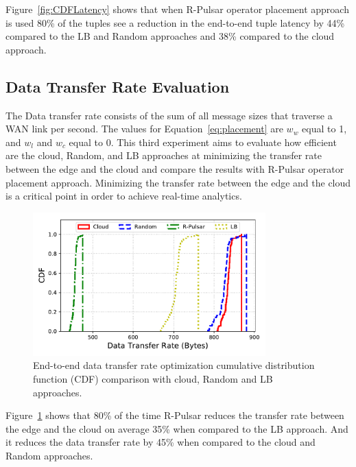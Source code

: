 Figure~\ref{fig:CDFLatency} shows that when R-Pulsar operator placement approach is used 80\% of the tuples see a reduction in the end-to-end tuple latency by 44\% compared to the LB and Random approaches and 38\% compared to the cloud approach. 

\subsection{Data Transfer Rate Evaluation}

The Data transfer rate consists of the sum of all message sizes that traverse a WAN link per second. The values for Equation~\ref{eq:placement} are $w_w$ equal to 1, and $w_l$ and $w_c$ equal to 0. This third experiment aims to evaluate how efficient are the cloud, Random, and LB approaches at minimizing the transfer rate between the edge and the cloud and compare the results with R-Pulsar operator placement approach. Minimizing the transfer rate between the edge and the cloud is a critical point in order to achieve real-time analytics. 

\begin{figure}
  \centering
  \includegraphics[width=0.8\textwidth]{Results/CDF_bandwidth.pdf}
  \caption{End-to-end data transfer rate optimization cumulative distribution function (CDF) comparison with cloud, Random and LB approaches.}
  \label{fig:bandwidth}
\end{figure} 


Figure~\ref{fig:bandwidth} shows that 80\% of the time R-Pulsar reduces the transfer rate between the edge and the cloud on average 35\% when compared to the LB approach. And it reduces the data transfer rate by 45\% when compared to the cloud and Random approaches.

